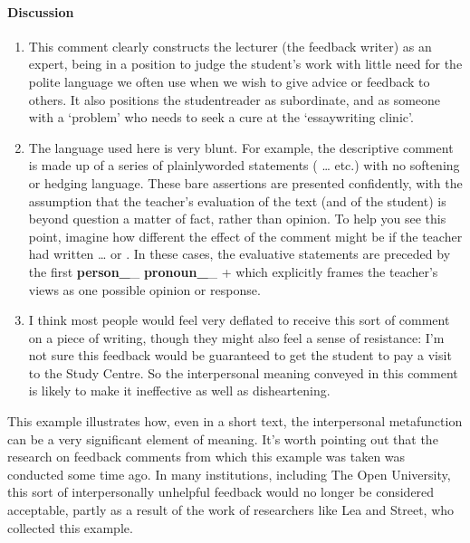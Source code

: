 \documentclass[letterpaper,10pt,english]{sphinxmanual}
\begin{document}
\paragraph{Discussion}
\label{\detokenize{content/session_00/Part_00_04:Discussion}}\begin{enumerate}
%
\item {} 
This comment clearly constructs the lecturer (the feedback writer) as an expert, being in a position to judge the student’s work with little need for the polite language we often use when we wish to give advice or feedback to others. It also positions the student\sphinxhyphen{}reader as subordinate, and as someone with a ‘problem’ who needs to seek a cure at the ‘essay\sphinxhyphen{}writing clinic’.

\item {} 
The language used here is very blunt. For example, the descriptive comment is made up of a series of plainly\sphinxhyphen{}worded statements ( … etc.) with no softening or hedging language. These bare assertions are presented confidently, with the assumption that the teacher’s evaluation of the text (and of the student) is beyond question \textendash{} a matter of fact, rather than opinion. To help you see this point, imagine how different the effect
of the comment might be if the teacher had written … or . In these cases, the evaluative statements are preceded by the first {\color{red}\bfseries{}person\_}\_ {\color{red}\bfseries{}pronoun\_}\_ +  which explicitly frames the teacher’s views as one possible opinion or response.

\item {} 
I think most people would feel very deflated to receive this sort of comment on a piece of writing, though they might also feel a sense of resistance: I’m not sure this feedback would be guaranteed to get the student to pay a visit to the Study Centre. So the interpersonal meaning conveyed in this comment is likely to make it ineffective as well as disheartening.

\end{enumerate}

This example illustrates how, even in a short text, the interpersonal metafunction can be a very significant element of meaning. It’s worth pointing out that the research on feedback comments from which this example was taken was conducted some time ago. In many institutions, including The Open University, this sort of interpersonally unhelpful feedback would no longer be considered acceptable, partly as a result of the work of researchers like Lea and Street, who collected this example.
\end{document}
